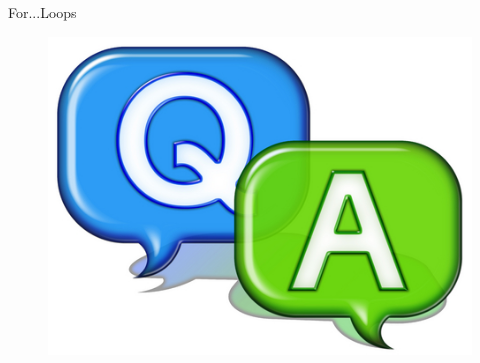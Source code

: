 \documentclass[14pt]{beamer}
\begin{document}
\begin{frame}{For...Loops}
 \begin{figure}[H]
 \begin{center}
   \includegraphics[scale=.3]{qa.png}   
 \end{center}
  \end{figure}
\end{frame}
\end{document}
